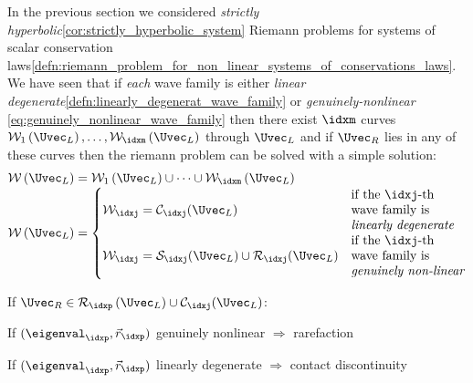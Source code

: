 \begin{sectionbox}\nospacing
   In the previous section we considered \textit{strictly hyperbolic}\cref{cor:strictly_hyperbolic_system} Riemann problems for systems of scalar conservation laws\cref{defn:riemann_problem_for_non_linear_systems_of_conservations_laws}.
   We have seen that if \textit{each} wave family is either \textit{linear degenerate}\cref{defn:linearly_degenerat_wave_family} or \textit{genuinely-nonlinear} \cref{eq:genuinely_nonlinear_wave_family} then there
   exist $\idxm$ curves $\mathcal{W}_{1}\left(\Uvec_{L}\right),\ldots,\mathcal{W}_{\idxm}\left(\Uvec_{L}\right)$ through $\Uvec_{L}$ and if $\Uvec_{R}$
   lies in any of these curves then the riemann problem can be solved with a simple solution:
   \begin{align}
     \mathcal{W}\left(\Uvec_{L}\right)&=\mathcal{W}_{1}\left(\Uvec_{L}\right)\cup\cdots\cup\mathcal{W}_{\idxm}\left(\Uvec_{L}\right)\\[-1\jot]
     \mathcal{W}\left(\Uvec_{L}\right)&=
     \begin{cases}
         \mathcal{W}_{\idxj}=\mathcal{C}_{\idxj}(\Uvec_{L})&
         \begin{aligned}
             &\text{if the $\idxj$-th}\\ &\text{wave family is}\\ &\text{\textit{linearly degenerate}}
         \end{aligned}\\
         \mathcal{W}_{\idxj}=\mathcal{S}_{\idxj}(\Uvec_{L})\cup\mathcal{R}_{\idxj}(\Uvec_{L})&
         \begin{aligned}
            &\text{if the $\idxj$-th}\\ &\text{wave family is}\\ &\text{\textit{genuinely non-linear}}
         \end{aligned}\\
     \end{cases}\nonumber
   \end{align}
   \begin{circlelistnosep}
       \item If $\Uvec_{R}\in\mathcal{R}_{\idxp}\left(\Uvec_{L}\right)\cup\mathcal{C}_{\idxj}(\Uvec_{L})$:
       \begin{itemizenosep}
           \item If $(\eigenval_{\idxp},\vec{r}_{\idxp})$ genuinely nonlinear $\Rightarrow$ rarefaction
           \item If $(\eigenval_{\idxp},\vec{r}_{\idxp})$ linearly degenerate $\Rightarrow$ contact discontinuity

\end{itemizenosep}
\end{circlelistnosep}
\end{sectionbox}
